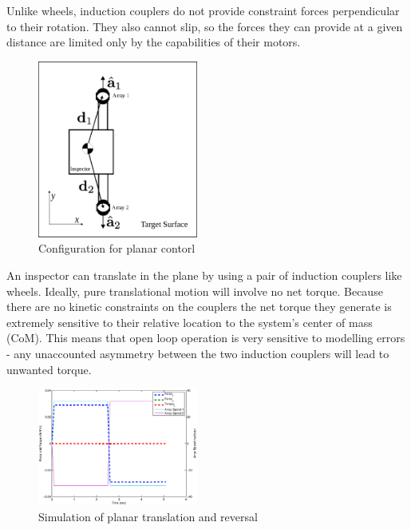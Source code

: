 \documentclass[letterpaper, 10 pt, conference]{ieeeconf}  %
\begin{document}
Unlike wheels, induction couplers do not provide constraint forces perpendicular to their rotation. They also cannot slip, so the forces they can provide at a given distance are limited only by the capabilities of their motors. 
%
 
   \begin{figure}[thpb]
      \centering
      \includegraphics[width = 0.47\textwidth]{figures/surface_locomotion.eps}
      \caption{Configuration for planar contorl}
      \label{fig:planarsetup}
   \end{figure}

  An inspector can translate in the plane by using a pair of induction couplers like wheels. Ideally, pure translational motion will involve no net torque. Because there are no kinetic constraints on the couplers the net torque they generate is extremely sensitive to their relative location to the system's center of mass (CoM)\label{def:com}. This means that open loop operation is very sensitive to modelling errors - any unaccounted asymmetry between the two induction couplers will lead to unwanted torque.
  
     \begin{figure}[thpb]
      	\centering
  		\includegraphics[width = 0.47\textwidth]{figures/planar_translation.eps}
      		\caption{Simulation of planar translation and reversal}
      		\label{fig:planartranslation}
   \end{figure}
      
\end{document}
